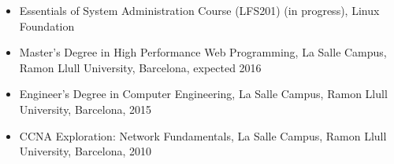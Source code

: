 \begin{itemize}[itemsep=0pt]

    \item Essentials of System Administration Course (LFS201) (in progress), Linux Foundation

    \item Master's Degree in High Performance Web Programming, La Salle Campus, Ramon Llull University, Barcelona, expected 2016

    \item Engineer's Degree in Computer Engineering, La Salle Campus, Ramon Llull University, Barcelona, 2015

    \item CCNA Exploration: Network Fundamentals, La Salle Campus, Ramon Llull University, Barcelona, 2010

\end{itemize}